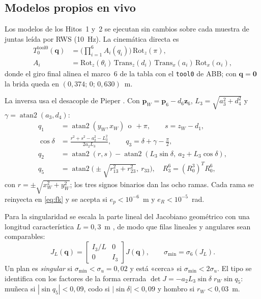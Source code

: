 \documentclass[conference]{IEEEtran}
\begin{document}
\subsection{Modelos propios en vivo}

Los modelos de los Hitos~1 y~2 se ejecutan sin cambios sobre cada
muestra de juntas leída por RWS (10~Hz). La cinemática directa es
\begin{equation}
\begin{split}
  T_0^{\text{tool0}}(\bm q)&=\Big(\prod_{i=1}^{6}A_i(q_i)\Big)\,
     \mathrm{Rot}_z(\pi),\\
  A_i&=\mathrm{Rot}_z(\theta_i)\,\mathrm{Trans}_z(d_i)\,
      \mathrm{Trans}_x(a_i)\,\mathrm{Rot}_x(\alpha_i),
\end{split}
  \label{eq:fk}
\end{equation}
donde el giro final alinea el marco~6 de la tabla con el \texttt{tool0}
de ABB; con $\bm q=\bm 0$ la brida queda en $(0{,}374;\,0;\,0{,}630)$~m.

La inversa usa el desacople de Pieper \cite{b3}. Con
$\bm p_W=\bm p_6-d_6\bm z_6$, $L_3=\sqrt{a_3^2+d_4^2}$ y
$\gamma=\operatorname{atan2}(a_3,d_4)$:
\begin{equation}
\begin{split}
  q_1 &= \operatorname{atan2}(y_W,x_W)\ \ \text{o}\ \ +\pi,\qquad
  s=z_W-d_1,\\
  \cos\delta &= \frac{r^2+s^2-a_2^2-L_3^2}{2a_2L_3},\qquad
  q_3=\delta+\gamma-\tfrac{\pi}{2},\\
  q_2 &= \operatorname{atan2}(r,s)-
         \operatorname{atan2}(L_3\sin\delta,\ a_2+L_3\cos\delta),\\
  q_5 &= \operatorname{atan2}\!\big(\pm\sqrt{r_{13}^2+r_{23}^2},\ r_{33}\big),
  \quad R_3^6=(R_0^3)^{T}R_0^6,
\end{split}
\label{eq:pieper}
\end{equation}
con $r=\pm\sqrt{x_W^2+y_W^2}$; los tres signos binarios dan las ocho
ramas. Cada rama se reinyecta en \eqref{eq:fk} y se acepta si
$e_p<10^{-6}$~m y $e_R<10^{-5}$~rad.

Para la singularidad se escala la parte lineal del Jacobiano geométrico
con una longitud característica $L=0{,}3$~m \cite{b4}, de modo que filas lineales
y angulares sean comparables:
\begin{equation}
  J_L(\bm q)=\begin{bmatrix} I_3/L & 0\\ 0 & I_3\end{bmatrix}J(\bm q),
  \qquad \sigma_{\min}=\sigma_6(J_L).
  \label{eq:sigma}
\end{equation}
Un plan es \emph{singular} si $\sigma_{\min}<\sigma_u=0{,}02$ y está
«cerca» si $\sigma_{\min}<2\sigma_u$. El tipo se identifica con los
factores de la forma cerrada
$\det J=-a_2L_3\sin\delta\; r_W\sin q_5$: muñeca si $|\sin q_5|<0{,}09$,
codo si $|\sin\delta|<0{,}09$ y hombro si $r_W<0{,}03$~m.
\end{document}
